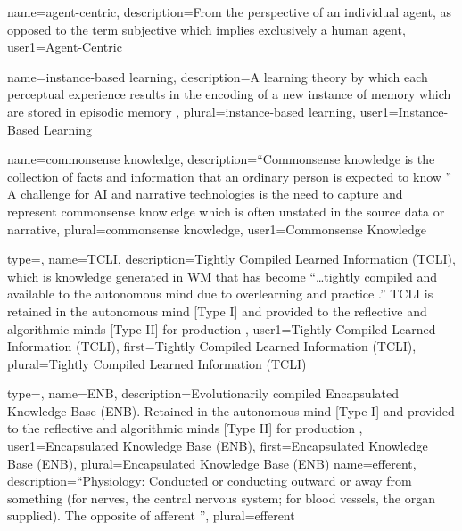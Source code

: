 {
  name=agent-centric,
  description={From the perspective of an individual \gls{agent}, as opposed to the term subjective which implies exclusively a human agent},
  user1={Agent-Centric}
}


{
  name=instance-based learning,
  description={A learning theory by which each perceptual experience results in the encoding of a new instance of memory which are stored in episodic memory \citep{sims2004episodic, anderson2004integrated}},
  plural=instance-based learning,
  user1={Instance-Based Learning}
}

{
  name=commonsense knowledge,
  description={``Commonsense knowledge is the collection of facts and information that an ordinary person is expected to know \citep{davis1990representations}'' A challenge for \gls{AI} and narrative technologies is the need to capture and represent commonsense knowledge which is often unstated \citep{lietohybrid} in the source data or \gls{narrative}},
  plural=commonsense knowledge,
  user1={Commonsense Knowledge}
}

{
  type=\acronymtype,
  name=TCLI,
  description={Tightly Compiled Learned Information (TCLI), which is knowledge generated in \gls{WM} that has become ``\ldots{}tightly compiled and available to the autonomous mind due to overlearning and practice \citep{Stanovich2009IntTest}.'' TCLI is retained in the autonomous mind [Type I] and provided to the reflective and algorithmic minds [Type II] for production \citep{Stanovich2009IntTest}},
  user1={Tightly Compiled Learned Information (TCLI)},
  first={Tightly Compiled Learned Information (TCLI)},
  plural={Tightly Compiled Learned Information (TCLI)}
}


{
  type=\acronymtype,
  name=ENB,
  description={Evolutionarily compiled Encapsulated Knowledge Base (ENB).  Retained in the autonomous mind [Type I] and provided to the reflective and algorithmic minds [Type II] for production \citep{Stanovich2009IntTest} },
  user1={Encapsulated Knowledge Base (ENB)},
  first={Encapsulated Knowledge Base (ENB)},
  plural={Encapsulated Knowledge Base (ENB)}
}
{
  name=efferent,
  description={``Physiology: Conducted or conducting outward or away from something (for nerves, the central nervous system; for blood vessels, the organ supplied). The opposite of afferent \citep{Oxford2014}''},
  plural={efferent}
}


